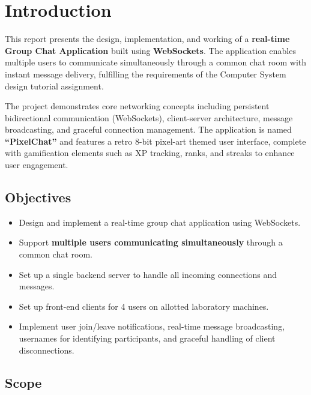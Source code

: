 \documentclass[12pt, a4paper]{article}
\begin{document}
\section{Introduction}

This report presents the design, implementation, and working of a \textbf{real-time Group Chat Application} built using \textbf{WebSockets}. The application enables multiple users to communicate simultaneously through a common chat room with instant message delivery, fulfilling the requirements of the Computer System design tutorial assignment.

The project demonstrates core networking concepts including persistent bidirectional communication (WebSockets), client-server architecture, message broadcasting, and graceful connection management. The application is named \textbf{``PixelChat''} and features a retro 8-bit pixel-art themed user interface, complete with gamification elements such as XP tracking, ranks, and streaks to enhance user engagement.

\subsection{Objectives}

\begin{itemize}[leftmargin=*]
    \item Design and implement a real-time group chat application using WebSockets.
    \item Support \textbf{multiple users communicating simultaneously} through a common chat room.
    \item Set up a single backend server to handle all incoming connections and messages.
    \item Set up front-end clients for 4 users on allotted laboratory machines.
    \item Implement user join/leave notifications, real-time message broadcasting, usernames for identifying participants, and graceful handling of client disconnections.
\end{itemize}

\subsection{Scope}
\end{document}
